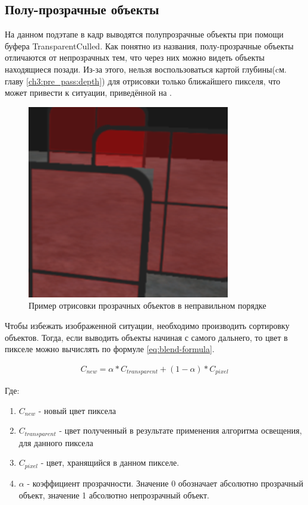 	\subsection{Полу-прозрачные объекты} \label{ch3:render_pass:transparents}
		На данном подэтапе в кадр выводятся полупрозрачные объекты при помощи буфера TransparentCulled. Как понятно из названия, полу-прозрачные объекты отличаются от непрозрачных тем, что через них можно видеть объекты находящиеся позади. Из-за этого, нельзя воспользоваться картой глубины(cм. главу \ref{ch3:pre_pass:depth}) для отрисовки только ближайшего пикселя, что может привести к ситуации, приведённой на .
		
		\begin{figure}[ht!] 
			\center
			\includegraphics [scale=0.5] {my_folder/images//incorrect_transparent}	
			\caption{Пример отрисовки прозрачных объектов в неправильном порядке} 
			\label{fig:incorrect_transparent}
		\end{figure}
		\FloatBarrier
		
		Чтобы избежать изображенной ситуации, необходимо производить сортировку объектов. Тогда, если выводить объекты начиная с самого дальнего, то цвет в пикселе можно вычислять по формуле \ref{eq:blend-formula}.
		
		\begin{equation}
			\label{eq:blend-formula}
			\begin{multlined}
				C_{new} = \alpha * C_{transparent} + (1 - \alpha) * C_{pixel}
			\end{multlined}
		\end{equation}
		
		Где:
		\begin{enumerate}[1.]
			\item $C_{new}$ - новый цвет пиксела
			\item $C_{transparent}$ - цвет полученный в результате применения алгоритма освещения, для данного пиксела
			\item $C_{pixel}$ - цвет, хранящийся в данном пикселе.
			\item $\alpha$ - коэффициент прозрачности. Значение 0 обозначает абсолютно прозрачный объект, значение 1 абсолютно непрозрачный объект.
		\end{enumerate}
		
